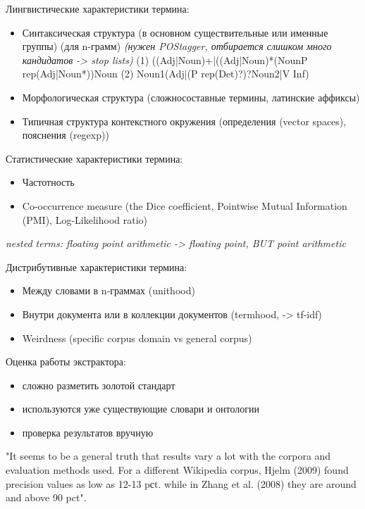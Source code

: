 \documentclass{beamer}
\begin{document}
\begin{frame}{Лингвистические характеристики термина:}

\begin{itemize}
\item Синтаксическая структура (в основном существительные или именные группы) (для n-грамм) \textit{(нужен POStagger, отбирается слишком много кандидатов -> stop lists)} 
(1) ((Adj|Noun)+|((Adj|Noun)*(NounP rep(Adj|Noun*))Noun
(2) Noun1(Adj|(P rep(Det)?)?Noun2|V Inf)
\item Морфологическая структура (сложносоставные термины, латинские аффиксы)
\item Типичная структура контекстного окружения (определения (vector spaces), пояснения (regexp)) 

\end{itemize}

\end{frame}

\begin{frame}{Статистические характеристики термина:}
\begin{itemize}
\item Частотность
\item Co-occurrence measure (the Dice coefficient, Pointwise Mutual Information (PMI), Log-Likelihood ratio)
\end{itemize}

		\textit{nested terms: floating point arithmetic -> floating point, BUT point arithmetic}

\end{frame}

\begin{frame}{Дистрибутивные характеристики термина:}

			
\begin{itemize}
\item Между словами в n-граммах (unithood)
\end{itemize}
\begin{itemize}
\item Внутри документа или в коллекции документов (termhood, -> tf-idf)
\item Weirdness (specific corpus domain vs general corpus)
\end{itemize}


\end{frame}

\begin{frame}{Оценка работы экстрактора:}
\begin{itemize}
\item сложно разметить золотой стандарт
\item используются уже существующие словари и онтологии
\item проверка результатов вручную
\end{itemize}

"It seems to be a general truth that results vary a lot with the corpora and evaluation
methods used. For a different Wikipedia corpus, Hjelm (2009) found precision
values as low as 12-13 pсt. while in Zhang et al. (2008) they are around and above
90 pct".

\end{frame}
\end{document}

